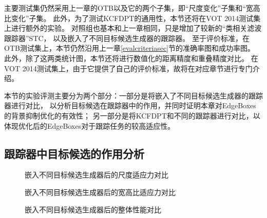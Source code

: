 主要测试集仍然采用上一章的OTB以及它的两个子集，即``尺度变化''子集和``宽高比变化''子集。
此外，为了测试KCFDPT的通用性，本节还将在VOT 2014测试集上进行额外的实验。
对照组也基本和上一章相同，只是增加了较新的``类相关滤波跟踪器''STC，
以及嵌入了不同目标候选生成器的跟踪器。
至于评价标准，在OTB测试集上，本节仍然沿用上一章\ref{evalcriteriasec}节的准确率图和成功率图。
此外，除了这两类统计图，本节还将进行数值化的距离精度和重叠精度对比。
在VOT 2014测试集上，由于它提供了自己的评价标准，故将在对应章节进行专门介绍。

本节的实验评测主要分为两个部分：一部分是将嵌入了不同目标候选生成器的跟踪器进行对比，
以分析目标候选在跟踪器中的作用，并同时证明本章对EdgeBoxes的背景抑制优化的有效性；
另一部分是将KCFDPT和不同的跟踪器进行对比，以体现优化后的EdgeBoxes对于跟踪任务的较高适应性。

\subsection{跟踪器中目标候选的作用分析}
\label{dpeffectsec}
\begin{figure}[htb]
  \centering
  \hspace{-2.5cm}
  \newline
  \caption{嵌入不同目标候选生成器后的尺度适应力对比}
  \label{resultdpscale}
\end{figure}

\begin{figure}[htb]
  \centering
  \hspace{-2.5cm}
  \newline
  \caption{嵌入不同目标候选生成器后的宽高比适应力对比}
  \label{resultdpas}
\end{figure}

\begin{figure}[htb]
  \centering
  \hspace{-2.6cm}
  \newline
  \caption{嵌入不同目标候选生成器后的整体性能对比}
  \label{resultdpall}
\end{figure}

